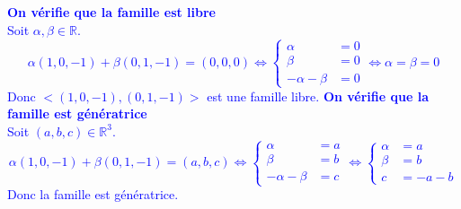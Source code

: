 \documentclass[a4paper,12pt]{article}
\def\R{\mathbb{R}}
\newcommand{\add}[1]{\textcolor{blue}{#1}}
\begin{document}
\begin{exercice}
\begin{enumerate}
             \add{
                {\bf On vérifie que la famille est libre}\\
             Soit $\alpha,\beta \in \R$.
                 $$
                 \alpha(1,0,-1)+\beta(0,1,-1)=(0,0,0)
                 \iff
                 \left\{
                     \begin{aligned}
                         \alpha&=0\\
                         \beta&=0\\
                         -\alpha-\beta&=0
                     \end{aligned}
                 \right.
                 \iff
                 \alpha=\beta=0
                 $$
             Donc $<(1,0,-1),(0,1,-1)>$ est une famille libre.
            \newline
            \newline
             {\bf On vérifie que la famille est génératrice}\\
             Soit $(a,b,c)\in\R^3$.
             $$\alpha(1,0,-1)+\beta(0,1,-1)=(a,b,c)\iff
                 \left\{
                     \begin{aligned}
                         \alpha&=a\\
                         \beta&=b\\
                         -\alpha-\beta&=c
                     \end{aligned}
                 \right.
                \iff
                 \left\{
                     \begin{aligned}
                         \alpha&=a\\
                         \beta&=b\\
                         c&=-a-b
                     \end{aligned}
                 \right.
             $$
             Donc la famille est génératrice.
             }

     \end{enumerate}
    \end{exercice}
    
\end{document}
